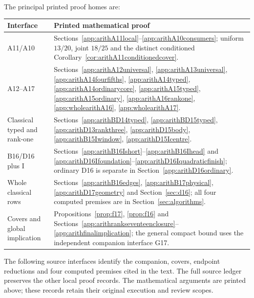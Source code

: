 \documentclass[11pt]{article}
\newcommand{\supp}[1]{\textsf{#1}}
\begin{document}
The principal printed proof homes are:
\begin{center}\small
\begin{tabular}{@{}>{\raggedright\arraybackslash}p{}>{\raggedright\arraybackslash}p{}@{}}
\toprule Interface&Printed mathematical proof\\\midrule
A11/A10&Sections~\ref{app:arithA11local}--\ref{app:arithA10consumers}; uniform \(13/20\), joint \(18/25\) and the distinct conditioned Corollary~\ref{cor:arithA11conditionedcover}.\\
A12--A17&Sections~\ref{app:arithA12universal}, \ref{app:arithA13universal}, \ref{app:arithA14fourfifths}, \ref{app:arithA14typed}, \ref{app:arithA14ordinarycore}, \ref{app:arithA15typed}, \ref{app:arithA15ordinary}, \ref{app:arithA16rankone}, \ref{app:wholearithA16}, \ref{app:wholearithA17}.\\
Classical typed and rank-one&Sections~\ref{app:arithBD14typed}, \ref{app:arithBD15typed}, \ref{app:arithD13rankthree}, \ref{app:arithD15body}, \ref{app:arithB15Iwindow}, \ref{app:arithD15Icentre}.\\
B16/D16 plus I&Sections~\ref{app:arithB16Ishort}--\ref{app:arithB16Ihead} and \ref{app:arithD16Ifoundation}--\ref{app:arithD16Iquadraticfinish}; ordinary D16 is separate in Section~\ref{app:arithD16ordinary}.\\
Whole classical rows&Sections~\ref{app:arithB16edges}, \ref{app:arithB17physical}, \ref{app:arithD17geometry} and Section~\ref{sec:d16}; all four computed premises are in Section~\ref{sec:algorithms}.\\
Covers and global implication&Propositions~\ref{prop:f17}, \ref{prop:f16} and Sections~\ref{app:arithrankseventeenclosure}--\ref{app:arithfinalimplication}; the general compact bound uses the independent companion interface \supp{G17}.\\
\bottomrule
\end{tabular}
\end{center}
The following source interfaces identify the companion, covers,
endpoint reductions and four computed premises cited in the text.
The full source ledger preserves the other local proof records.
The mathematical arguments are printed above; these records retain
their original execution and review scopes.
\end{document}
